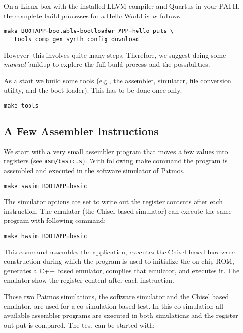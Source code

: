 \documentclass[a4paper,fontsize=10pt,twoside,DIV15,BCOR12mm,headinclude=true,footinclude=false,pagesize,bibtotoc]{scrbook}
\newcommand{\code}[1]{{\texttt{#1}}}
\begin{document}
On a Linux box with the installed LLVM compiler and Quartus in your PATH,
the complete build processes for a Hello World is as follows:

\begin{verbatim}
make BOOTAPP=bootable-bootloader APP=hello_puts \
   tools comp gen synth config download
\end{verbatim}

However, this involves quite many steps. Therefore, we suggest doing some \emph{manual}
buildup to explore the full build process and the possibilities.

As a start we build some tools (e.g., the assembler, simulator, file conversion
utility, and the boot loader). This has to be done once only.

\begin{verbatim}
make tools
\end{verbatim}

\subsection{A Few Assembler Instructions}

We start with a very small assembler program that moves a few values into registers
(see \code{asm/basic.s}). With following make command the program is assembled
and executed in the software simulator of Patmos.

\begin{verbatim}
make swsim BOOTAPP=basic
\end{verbatim}

The simulator options are set to write out the register contents after each instruction.
The emulator (the Chisel based simulator) can execute the same program
with following command:

\begin{verbatim}
make hwsim BOOTAPP=basic
\end{verbatim}

This command assembles the application, executes the Chisel based hardware
construction during which the program is used to initialize the on-chip ROM,
generates a C++ based emulator, compiles that emulator, and executes it.
The emulator show the register content after each instruction.

Those two Patmos simulations, the software simulator and the Chisel based emulator,
are used for a co-simulation based test. In this co-simulation all available assembler
programs are executed in both simulations and the register out put is compared.
The test can be started with:
\end{document}
